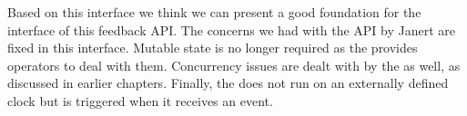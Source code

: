 Based on this interface we think we can present a good foundation for the interface of this feedback API. The concerns we had with the API by Janert are fixed in this interface. Mutable state is no longer required as the \obs provides operators to deal with them. Concurrency issues are dealt with by the \obs as well, as discussed in earlier chapters. Finally, the \comp does not run on an externally defined clock but is triggered when it receives an event.

































































\clearpage
{}

